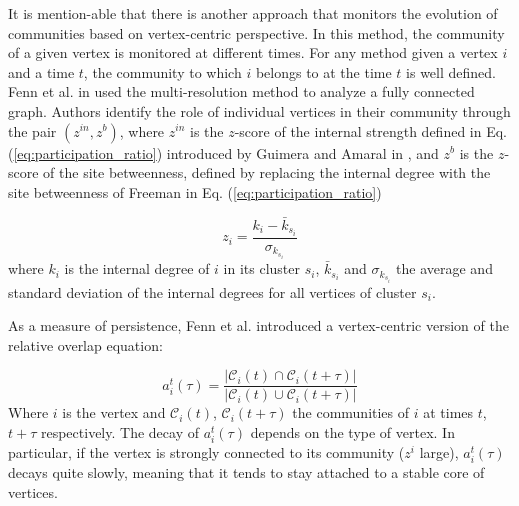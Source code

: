 It is mention-able that there is another approach that monitors the evolution of communities based on vertex-centric perspective. In this method, the community of a given vertex is monitored at different times. For any method given a vertex $i$ and a time $t$, the community to which $i$ belongs to at the time $t$ is well defined. Fenn et al. in \cite{ref-55} used the multi-resolution method to analyze a fully connected graph. Authors identify the role of individual vertices in their community through the pair $(z^{in}, z^b)$, where $z^{in}$ is the $z$-score of the internal strength defined in Eq. (\ref{eq:participation_ratio}) introduced by Guimera and Amaral in \cite{ref-56}, and $z^b$  is the $z$-score of the site betweenness, defined by replacing the internal degree with the site betweenness of Freeman \cite{ref-11} in Eq. (\ref{eq:participation_ratio})

\begin{equation}\label{eq:participation_ratio}
z_i = \dfrac{k_i - \bar{k}_{s_{i}}}{\sigma_{k_{s_{i}}}}
\end{equation}
where $k_i$ is the internal degree of $i$ in its cluster $s_i$, $\bar{k}_{s_{i}}$ and $\sigma_{k_{s_{i}}}$ the average and standard deviation of the internal degrees for all vertices of cluster $s_{i}$.

As a measure of persistence, Fenn et al. introduced a vertex-centric version of the relative overlap equation:

\begin{equation}
a_i^t(\tau) = \dfrac{\lvert\mathcal{C}_i(t) \cap \mathcal{C}_i(t+\tau)\rvert}{\lvert\mathcal{C}_i(t) \cup \mathcal{C}_i(t+\tau)\rvert}
\end{equation}
Where $i$ is the vertex and $\mathcal{C}_i(t)$, $\mathcal{C}_i(t+\tau)$ the communities of $i$ at times $t$, $t+\tau$ respectively. The decay of $a_i^t(\tau)$ depends on the type of vertex. In particular, if the vertex is strongly connected to its community ($z^i$ large), $a_i^t(\tau)$ decays quite slowly, meaning that it tends to stay attached to a stable core of vertices.